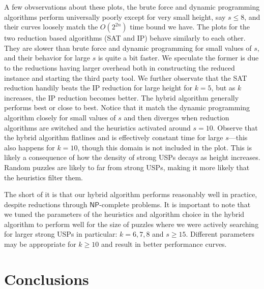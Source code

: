 \documentclass[11pt]{article}
\renewcommand\NP{\ensuremath{\mathsf{NP}}}
\begin{document}
A few obvservations about these plots, the brute force and dynamic
programming algorithms perform universally poorly except for very
small height, say $s \le 8$, and their curves loosely match the
$O(2^{2n})$ time bound we have.  The plots for the two reduction based
algorithms (SAT and IP) behave similarly to each other.  They are
slower than brute force and dynamic programming for small values of
$s$, and their behavior for large $s$ is quite a bit faster.  We
speculate the former is due to the reductions having larger overhead
both in constructing the reduced instance and starting the third party
tool.  We further observate that the SAT reduction handily beats the
IP reduction for large height for $k = 5$, but as $k$ increases, the
IP reduction becomes better.  The hybrid algorithm generally performs
best or close to best.  Notice that it match the dynamic programming
algorithm closely for small values of $s$ and then diverges when
reduction algorithms are switched and the heuristics activated around
$s = 10$.  Observe that the hybrid algorithm flatlines and is
effectively constant time for large $s$---this also happens for $k =
10$, though this domain is not included in the plot.  This is likely a
consequence of how the density of strong USPs decays as height
increases.  Random puzzles are likely to far from strong USPs, making
it more likely that the heuristics filter them.

The short of it is that our hybrid algorithm performs reasonably well
in practice, despite reductions through \NP{}-complete problems.  It
is important to note that we tuned the parameters of the heuristics
and algorithm choice in the hybrid algorithm to perform well for the
size of puzzles where we were actively searching for larger strong
USPs in particular: $k = 6, 7, 8$ and $s \ge 15$.  Different
parameters may be appropriate for $k \ge 10$ and result in better
performance curves.



\section{Conclusions}
\label{sec:conclusion}
\end{document}
